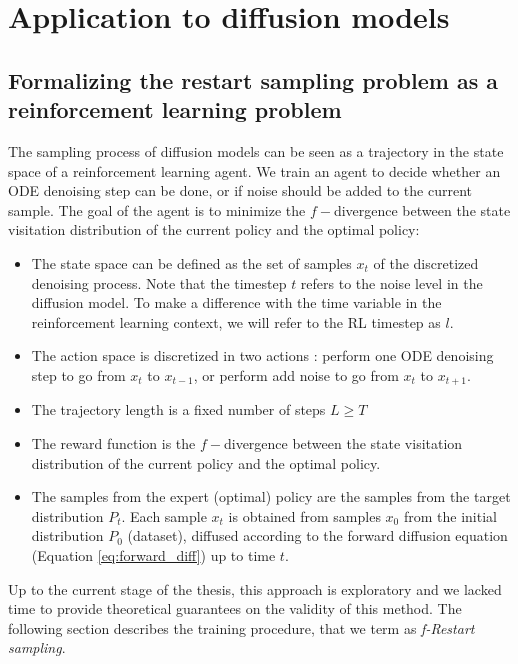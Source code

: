 \section{Application to diffusion models}\label{sec:rl:sec3}
\subsection{Formalizing the restart sampling problem as a reinforcement learning problem}
The sampling process of diffusion models can be seen as a trajectory in the state space of a reinforcement learning agent. We train an agent to decide whether an ODE denoising step can be done, or if noise should be added to the current sample. The goal of the agent is to minimize the $f-$divergence between the state visitation distribution of the current policy and the optimal policy: 
\begin{itemize}
    \item  The state space can be defined as the set of samples $x_{t}$ of the discretized denoising process. Note that the timestep $t$ refers to the noise level in the diffusion model. To make a difference with the time variable in the reinforcement learning context, we will refer to the RL timestep as $l$.
    \item The action space is discretized in two actions : perform one ODE denoising step to go from $x_{t}$ to $x_{t-1}$, or perform add noise to go from $x_{t}$ to $x_{t+1}$.
    \item The trajectory length is a fixed number of steps $L \geq T$
    \item The reward function is the $f-$divergence between the state visitation distribution of the current policy and the optimal policy.
    \item The samples from the expert (optimal) policy are the samples from the target distribution $P_{t}$. Each sample $x_{t}$ is obtained from samples $x_{0}$ from the initial distribution $P_{0}$ (dataset), diffused according to the forward diffusion equation (Equation \ref{eq:forward_diff}) up to time $t$.
\end{itemize}
Up to the current stage of the thesis, this approach is exploratory and we lacked time to provide theoretical guarantees on the validity of this method. The following section describes the training procedure, that we term as \textit{f-Restart sampling}.
